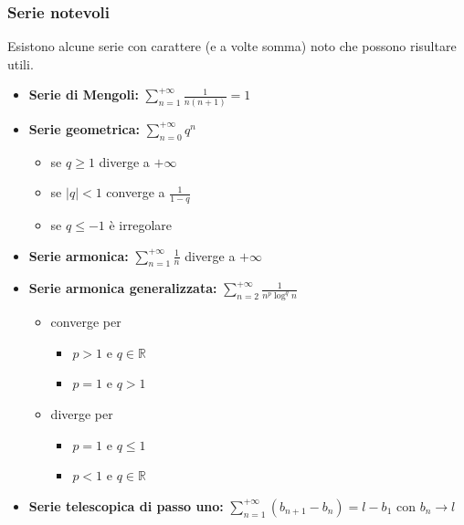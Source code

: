 \documentclass{article}
\begin{document}
\subsubsection{Serie notevoli}
Esistono alcune serie con carattere (e a volte somma) noto che possono risultare utili.
\begin{itemize}
    \item \textbf{Serie di Mengoli:} $\sum_{n=1}^{+\infty}\frac{1}{n(n+1)}=1$
    \item \textbf{Serie geometrica:} $\sum_{n=0}^{+\infty}q^n$ \begin{itemize}
        \item se $q\geq1$ diverge a $+\infty$
        \item se $|q|<1$ converge a $\frac{1}{1-q}$
        \item se $q\leq-1$ è irregolare
    \end{itemize}
    \item \textbf{Serie armonica:} $\sum_{n=1}^{+\infty}\frac{1}{n}$ diverge a $+\infty$
    \item \textbf{Serie armonica generalizzata:} $\sum_{n=2}^{+\infty}\frac{1}{n^p\log^qn}$ \begin{itemize}
        \item converge per \begin{itemize}
            \item $p>1$ e $q\in\mathds{R}$
            \item $p=1$ e $q>1$
        \end{itemize}
        \item diverge per \begin{itemize}
            \item $p=1$ e $q\leq1$
            \item $p<1$ e $q\in\mathds{R}$
        \end{itemize}
    \end{itemize}
    \item \textbf{Serie telescopica di passo uno:} $\sum_{n=1}^{+\infty}(b_{n+1}-b_n)=l-b_1$ con $b_n\rightarrow l$
\end{itemize}
\end{document}
